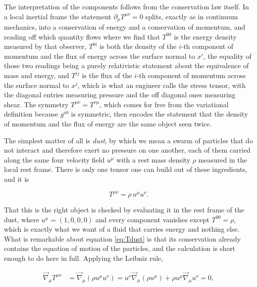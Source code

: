         The interpretation of the components follows from the conservation law itself. In a local inertial frame the statement $\partial_{\mu}T^{\mu\nu}=0$ splits, exactly as in continuum mechanics, into a conservation of energy and a conservation of momentum, and reading off which quantity flows where we find that $T^{00}$ is the energy density measured by that observer, $T^{0i}$ is both the density of the $i$-th component of momentum and the flux of energy across the surface normal to $x^i$, the equality of those two readings being a purely relativistic statement about the equivalence of mass and energy, and $T^{ij}$ is the flux of the $i$-th component of momentum across the surface normal to $x^j$, which is what an engineer calls the stress tensor, with the diagonal entries measuring pressure and the off diagonal ones measuring shear. The symmetry $T^{\mu\nu}=T^{\nu\mu}$, which comes for free from the variational definition because $g^{ab}$ is symmetric, then encodes the statement that the density of momentum and the flux of energy are the same object seen twice.

        The simplest matter of all is \textit{dust}, by which we mean a swarm of particles that do not interact and therefore exert no pressure on one another, each of them carried along the same four velocity field $u^{\mu}$ with a rest mass density $\rho$ measured in the local rest frame. There is only one tensor one can build out of these ingredients, and it is

        \begin{equation}\label{eq:Tdust}
            T^{\mu\nu} = \rho\, u^{\mu}u^{\nu}.
        \end{equation}

        That this is the right object is checked by evaluating it in the rest frame of the dust, where $u^{\mu}=(1,0,0,0)$ and every component vanishes except $T^{00}=\rho$, which is exactly what we want of a fluid that carries energy and nothing else. What is remarkable about equation \ref{eq:Tdust} is that its conservation already contains the equation of motion of the particles, and the calculation is short enough to do here in full. Applying the Leibniz rule,

        \begin{align*}
            \Vec{\nabla}_{\mu}T^{\mu\nu} &= \Vec{\nabla}_{\mu}\left(\rho u^{\mu}u^{\nu}\right) = u^{\nu}\Vec{\nabla}_{\mu}\left(\rho u^{\mu}\right) + \rho u^{\mu}\Vec{\nabla}_{\mu}u^{\nu} = 0,
        \end{align*}

